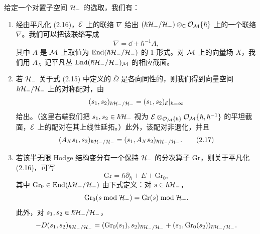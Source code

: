\begin{proposition}
给定一个对置子空间 $\mathcal{H}_-$ 的选取，我们有：
\begin{enumerate}[label=(\arabic*)]
\item 经由平凡化 (2.16)，$\mathcal{E}$ 上的联络 $\nabla$ 给出 $(\hbar\mathcal{H}_-/\mathcal{H}_-)\otimes_{\mathbb{C}}\mathcal{O}_{\mathcal{M}}\{\hbar\}$ 上的一个联络 $\nabla$。我们可以把该联络写成
\[
\nabla=\dd+\hbar^{-1}A,
\]
其中 $A$ 是 $\mathcal{M}$ 上取值为 $\mathrm{End}(\hbar\mathcal{H}_-/\mathcal{H}_-)$ 的 1-形式。对 $\mathcal{M}$ 上的向量场 $X$，我们用 $A_X$ 记平凡丛 $\mathrm{End}(\hbar\mathcal{H}_-/\mathcal{H}_-)_{\mathcal{M}}$ 的相应截面。
\item 若 $\mathcal{H}_-$ 关于式 (2.15) 中定义的 $\overline{\Omega}$ 是各向同性的，则我们得到向量空间 $\hbar\mathcal{H}_-/\mathcal{H}_-$ 上的对称配对，由
\[
(s_1,s_2)_{\hbar\mathcal{H}_-/\mathcal{H}_-}=(s_1,s_2)_{\mathcal{E}}|_{\hbar=\infty}
\]
给出。（这里右端我们把 $s_1,s_2\in\hbar\mathcal{H}_-$ 视为 $\mathcal{E}\otimes_{\mathcal{O}_{\mathcal{M}}\{\hbar\}}\mathcal{O}_{\mathcal{M}}\{\hbar,\hbar^{-1}\}$ 的平坦截面，$\mathcal{E}$ 上的配对在其上线性延拓。）此外，该配对非退化，并且
\begin{equation}
(A_Xs_1,s_2)_{\hbar\mathcal{H}_-/\mathcal{H}_-}=(s_1,A_Xs_2)_{\hbar\mathcal{H}_-/\mathcal{H}_-}. \tag{2.17}
\end{equation}
\item 若该半无限 Hodge 结构变分有一个保持 $\mathcal{H}_-$ 的分次算子 $\mathrm{Gr}$，则关于平凡化 (2.16)，可写
\[
\mathrm{Gr}=\hbar\partial_\hbar+E+\mathrm{Gr}_0,
\]
其中 $\mathrm{Gr}_0\in\mathrm{End}(\hbar\mathcal{H}_-/\mathcal{H}_-)$ 由下式定义：对 $s\in\hbar\mathcal{H}_-$，
\[
\mathrm{Gr}_0(s\bmod\mathcal{H}_-)=\mathrm{Gr}(s)\bmod\mathcal{H}_-.
\]
此外，对 $s_1,s_2\in\hbar\mathcal{H}_-/\mathcal{H}_-$，
\[
-D(s_1,s_2)_{\hbar\mathcal{H}_-/\mathcal{H}_-}=(\mathrm{Gr}_0(s_1),s_2)_{\hbar\mathcal{H}_-/\mathcal{H}_-}+(s_1,\mathrm{Gr}_0(s_2))_{\hbar\mathcal{H}_-/\mathcal{H}_-}.
\]
\end{enumerate}
\end{proposition}

